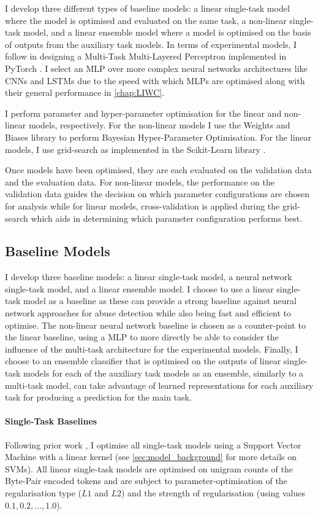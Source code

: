 I develop three different types of baseline models: a linear single-task model where the model is optimised and evaluated on the same task, a non-linear single-task model, and a linear ensemble model where a model is optimised on the basis of outputs from the auxiliary task models.
In terms of experimental models, I follow \citet{Waseem:2018} in designing a Multi-Task Multi-Layered Perceptron implemented in PyTorch \citep{Paszke:2019}. I select an MLP over more complex neural networks architectures like CNNs and LSTMs due to the speed with which MLPs are optimised along with their general performance in \cref{chap:LIWC}.

I perform parameter and hyper-parameter optimisation for the linear and non-linear models, respectively.
For the non-linear models I use the Weights and Biases library \citep{Wandb} to perform Bayesian Hyper-Parameter Optimisation.
For the linear models, I use grid-search as implemented in the Scikit-Learn library \citep{Pedregosa:2011}.

Once models have been optimised, they are each evaluated on the validation data and the evaluation data.
For non-linear models, the performance on the validation data guides the decision on which parameter configurations are chosen for analysis while for linear models, cross-validation is applied during the grid-search which aids in determining which parameter configuration performs best.

\subsection{Baseline Models}\label{sub:mtl_baselines}
I develop three baseline models: a linear single-task model, a neural network single-task model, and a linear ensemble model.
I choose to use a linear single-task model as a baseline as these can provide a strong baseline against neural network approaches for abuse detection while also being fast and efficient to optimise.
The non-linear neural network baseline is chosen as a counter-point to the linear baseline, using a MLP to more directly be able to consider the influence of the multi-task architecture for the experimental models.
Finally, I choose to an ensemble classifier that is optimised on the outputs of linear single-task models for each of the auxiliary task models as an ensemble, similarly to a multi-task model, can take advantage of learned representations for each auxiliary task for producing a prediction for the main task.

\paragraph{Single-Task Baselines}
Following prior work \citep{Waseem:2016,Davidson:2017}, I optimise all single-task models using a Support Vector Machine with a linear kernel (see \cref{sec:model_background} for more details on SVMs).
All linear single-task models are optimised on unigram counts of the Byte-Pair encoded tokens and are subject to parameter-optimisation of the regularisation type ($L1$ and $L2$) and the strength of regularisation (using values $0.1, 0.2, \ldots, 1.0$).

